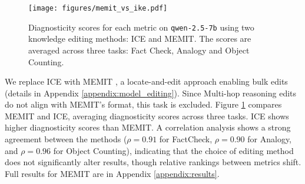 \begin{figure}[htb]
    \centering
    \texttt{[image: figures/memit\_vs\_ike.pdf]}
    \caption{Diagnosticity scores for each metric on \texttt{qwen-2.5-7b} using two knowledge editing methods: ICE and MEMIT. The scores are averaged across three tasks: Fact Check, Analogy and Object Counting.}
    \label{fig:edit_methods}
\end{figure}

We replace ICE with MEMIT \citep{meng2023memit}, a locate-and-edit approach enabling bulk edits (details in Appendix \ref{appendix:model_editing}). Since Multi-hop reasoning edits do not align with MEMIT's format, this task is excluded. Figure \ref{fig:edit_methods} compares MEMIT and ICE, averaging diagnosticity scores across three tasks. ICE shows higher diagnosticity scores than MEMIT. A correlation analysis shows a strong agreement between the methods ($\rho = 0.91$ for FactCheck, $\rho = 0.90$ for Analogy, and $\rho = 0.96$ for Object Counting), indicating that the choice of editing method does not significantly alter results, though relative rankings between metrics shift. Full results for MEMIT are in Appendix \ref{appendix:results}.